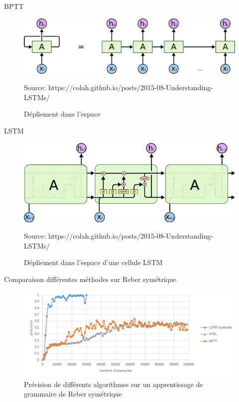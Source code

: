 \documentclass{beamer}
\begin{document}
\begin{frame}{BPTT}
  \begin{figure}
  \begin{center}
  \includegraphics[scale=0.16]{images/bptt.png}
  \caption{Dépliement dans l'espace}
  {\tiny Source: https://colah.github.io/posts/2015-08-Understanding-LSTMs/}
  \end{center}
  \end{figure}
\end{frame}

\begin{frame}{LSTM}
  \begin{figure}
  \begin{center}
  \includegraphics[scale=.40]{images/lstm_bptt.png}
  \caption{Dépliement dans l'espace d'une cellule LSTM}
  {\tiny Source: https://colah.github.io/posts/2015-08-Understanding-LSTMs/}
  \end{center}
  \end{figure}
\end{frame}

\begin{frame}{Comparaison différentes méthodes sur Reber symétrique}
  \begin{figure}
  \begin{center}
  \includegraphics[scale=.20]{images/comparaison.png}
  \caption{Précision de différents algorithmes sur un apprentissage de grammaire de Reber
  symétrique}
  \end{center}
  \end{figure}
\end{frame}
\end{document}
